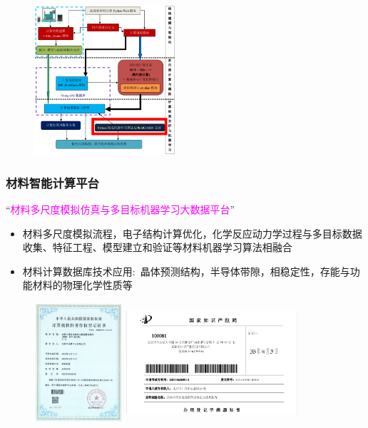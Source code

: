 \begin{frame}
\begin{minipage}[b]{0.47\linewidth}
\begin{figure}[h!]
\includegraphics[height=2.18in]{Figures/MP_comp_BCC.png}
\caption{\fontsize{6.5pt}{4.5pt}\selectfont{适用于异质界面的高通量材料计算自动流程软件架构}}%
\label{MP_comp_BCC}
\end{figure}
\end{minipage}
\end{frame}

\begin{frame}
	\frametitle{材料智能计算平台}
	“\textcolor{magenta}{材料多尺度模拟仿真与多目标机器学习大数据平台}”
	\begin{itemize}
		\item 材料多尺度模拟流程，电子结构计算优化，化学反应动力学过程与多目标数据收集、特征工程、模型建立和验证等材料机器学习算法相融合
		\item 材料计算数据库技术应用:~晶体预测结构，半导体带隙，相稳定性，存能与功能材料的物理化学性质等
	\end{itemize}
\begin{figure}[h!]
\centering
\vspace*{-7pt}
\includegraphics[height=1.75in]{Figures/BCC-MAPDM.jpg}
\includegraphics[height=1.75in,width=2.50in,viewport=0 0 801 486,clip]{Figures/Patent_license.png}
\label{BCC-Process_1}
\end{figure}
\end{frame}

